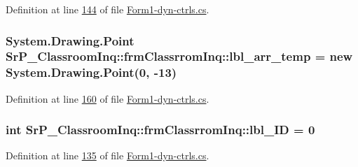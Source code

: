 \-Definition at line \hyperlink{_form1-dyn-ctrls_8cs_source_l00144}{144} of file \hyperlink{_form1-dyn-ctrls_8cs_source}{\-Form1-\/dyn-\/ctrls.\-cs}.

\hypertarget{class_sr_p___classroom_inq_1_1frm_classrrom_inq_ae3405b23105270490b9685ac52e1b574}{
\subsubsection[{lbl\-\_\-arr\-\_\-temp}]{\setlength{\rightskip}{0pt plus 5cm}\-System.\-Drawing.\-Point {\bf \-Sr\-P\-\_\-\-Classroom\-Inq\-::frm\-Classrrom\-Inq\-::lbl\-\_\-arr\-\_\-temp} = new \-System.\-Drawing.\-Point(0, -\/13)}}
\label{class_sr_p___classroom_inq_1_1frm_classrrom_inq_ae3405b23105270490b9685ac52e1b574}


\-Definition at line \hyperlink{_form1-dyn-ctrls_8cs_source_l00160}{160} of file \hyperlink{_form1-dyn-ctrls_8cs_source}{\-Form1-\/dyn-\/ctrls.\-cs}.

\hypertarget{class_sr_p___classroom_inq_1_1frm_classrrom_inq_a15d44adc56e5e6523bfadd27d9966935}{
\subsubsection[{lbl\-\_\-\-I\-D}]{\setlength{\rightskip}{0pt plus 5cm}int {\bf \-Sr\-P\-\_\-\-Classroom\-Inq\-::frm\-Classrrom\-Inq\-::lbl\-\_\-\-I\-D} = 0}}
\label{class_sr_p___classroom_inq_1_1frm_classrrom_inq_a15d44adc56e5e6523bfadd27d9966935}


\-Definition at line \hyperlink{_form1-dyn-ctrls_8cs_source_l00135}{135} of file \hyperlink{_form1-dyn-ctrls_8cs_source}{\-Form1-\/dyn-\/ctrls.\-cs}.

